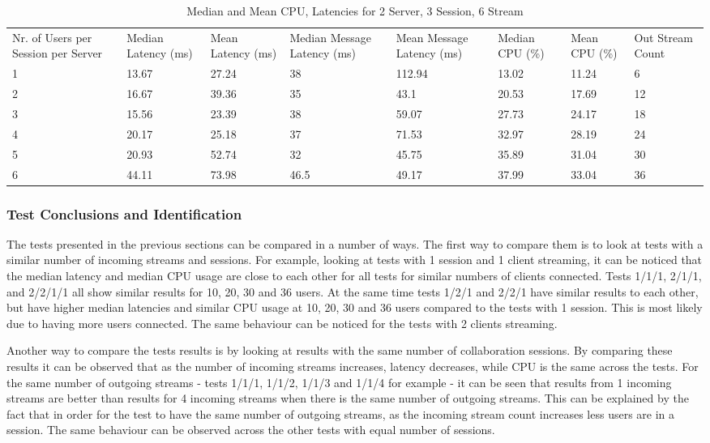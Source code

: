 \begin{table}
\caption{Median and Mean CPU, Latencies for 2 Server, 3 Session, 6 Stream}
\label{table:2serv_3sess_6str}
\begin{tabu} to\linewidth{|X[c]|X[c]|X[c]|X[c]|X[c]|X[c]|X[c]|X[c]|}
\everyrow{\hline}
\hline
Nr. of Users per Session per Server & Median Latency (ms) & Mean Latency (ms) & Median Message Latency (ms) & Mean Message Latency (ms) & Median CPU (\%) & Mean CPU (\%) & Out Stream Count\\
1 & 13.67 & 27.24 & 38 & 112.94 & 13.02 & 11.24 & 6 \\
2 & 16.67 & 39.36 & 35 & 43.1 & 20.53 & 17.69 & 12 \\
3 & 15.56 & 23.39 & 38 & 59.07 & 27.73 & 24.17 & 18 \\
4 & 20.17 & 25.18 & 37 & 71.53 & 32.97 & 28.19 & 24 \\
5 & 20.93 & 52.74 & 32 & 45.75 & 35.89 & 31.04 & 30 \\
6 & 44.11 & 73.98 & 46.5 & 49.17 & 37.99 & 33.04 & 36 \\
\end{tabu}
\end{table}

\subsubsection{Test Conclusions and Identification}

The tests presented in the previous sections can be compared in a number of ways. The first way to compare them is to look at tests with a similar number of incoming streams and sessions. For example, looking at tests with 1 session and 1 client streaming, it can be noticed that the median latency and median CPU usage are close to each other for all tests for similar numbers of clients connected. Tests 1/1/1, 2/1/1, and 2/2/1/1 all show similar results for 10, 20, 30 and 36 users. At the same time tests 1/2/1 and 2/2/1 have similar results to each other, but have higher median latencies and similar CPU usage at 10, 20, 30 and 36 users compared to the tests with 1 session. This is most likely due to having more users connected. The same behaviour can be noticed for the tests with 2 clients streaming.

Another way to compare the tests results is by looking at results with the same number of collaboration sessions. By comparing these results it can be observed that as the number of incoming streams increases, latency decreases, while CPU is the same across the tests. For the same number of outgoing streams - tests 1/1/1, 1/1/2, 1/1/3 and 1/1/4 for example - it can be seen that results from 1 incoming streams are better than results for 4 incoming streams when there is the same number of outgoing streams. This can be explained by the fact that in order for the test to have the same number of outgoing streams, as the incoming stream count increases less users are in a session. The same behaviour can be observed across the other tests with equal number of sessions.


